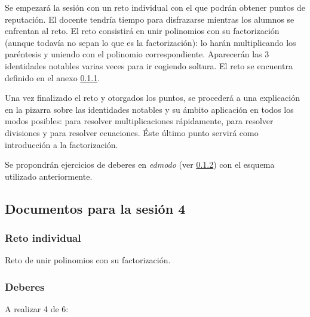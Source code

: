 Se empezará la sesión con un reto individual con el que podrán obtener puntos de reputación.
%
El docente tendría tiempo para disfrazarse mientras los alumnos se enfrentan al reto.
%
El reto consistirá en unir polinomios con su factorización (aunque todavía no sepan lo que es la factorización): lo harán multiplicando los paréntesis y uniendo con el polinomio correspondiente.
%
Aparecerán las 3 identidades notables varias veces para ir cogiendo soltura.
%
El reto se encuentra definido en el anexo \ref{app:ses4:indiv}.

Una vez finalizado el reto y otorgados los puntos, se procederá a una explicación en la pizarra sobre las identidades notables y su ámbito aplicación en todos los modos posibles:
%
para resolver multiplicaciones rápidamente, para resolver divisiones y para resolver ecuaciones.
%
Éste último punto servirá como introducción a la factorización.


Se propondrán ejercicios de deberes en \textit{edmodo} (ver \ref{ses4:deberes}) con el esquema utilizado anteriormente.


\subsection{Documentos para la sesión 4}

\subsubsection{Reto individual}
\label{app:ses4:indiv}

Reto de unir polinomios con su factorización.

\subsubsection{Deberes}
\label{ses4:deberes}

\newbloq A realizar 4 de 6:








